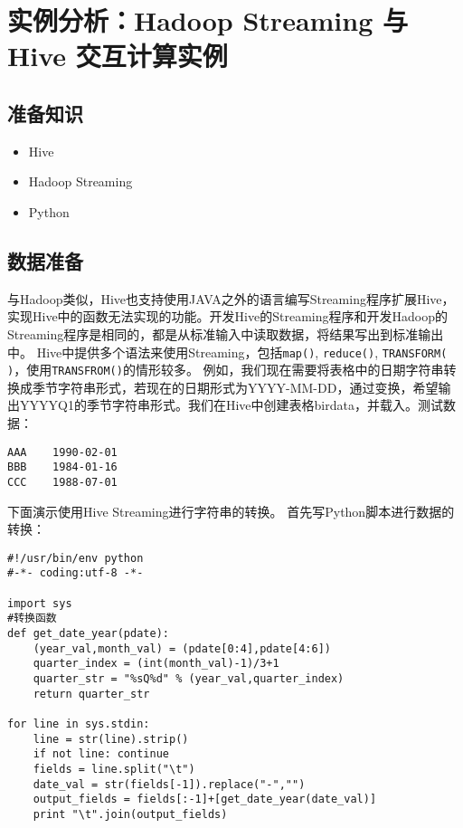 \section{实例分析：Hadoop Streaming 与 Hive
交互计算实例}\label{ux5b9eux4f8bux5206ux6790hadoop-streaming-ux4e0e-hive-ux4ea4ux4e92ux8ba1ux7b97ux5b9eux4f8b}

\subsection{准备知识}\label{ux51c6ux5907ux77e5ux8bc6}

\begin{itemize}
\itemsep1pt\parskip0pt
\item
  Hive
\item
  Hadoop Streaming
\item
  Python
\end{itemize}

\subsection{数据准备}\label{ux6570ux636eux51c6ux5907}

与Hadoop类似，Hive也支持使用JAVA之外的语言编写Streaming程序扩展Hive，实现Hive中的函数无法实现的功能。开发Hive的Streaming程序和开发Hadoop的Streaming程序是相同的，都是从标准输入中读取数据，将结果写出到标准输出中。
Hive中提供多个语法来使用Streaming，包括\texttt{map()}, \texttt{reduce()}, \texttt{TRANSFORM(
)}，使用\texttt{TRANSFROM()}的情形较多。
例如，我们现在需要将表格中的日期字符串转换成季节字符串形式，若现在的日期形式为YYYY-MM-DD，通过变换，希望输出YYYYQ1的季节字符串形式。我们在Hive中创建表格birdata，并载入。测试数据：

\begin{lstlisting}
AAA    1990-02-01
BBB    1984-01-16
CCC    1988-07-01
\end{lstlisting}

下面演示使用Hive Streaming进行字符串的转换。
首先写Python脚本进行数据的转换：

\begin{lstlisting}
#!/usr/bin/env python
#-*- coding:utf-8 -*-

import sys
#转换函数
def get_date_year(pdate):
    (year_val,month_val) = (pdate[0:4],pdate[4:6])
    quarter_index = (int(month_val)-1)/3+1
    quarter_str = "%sQ%d" % (year_val,quarter_index)
    return quarter_str

for line in sys.stdin:
    line = str(line).strip()
    if not line: continue
    fields = line.split("\t")
    date_val = str(fields[-1]).replace("-","")
    output_fields = fields[:-1]+[get_date_year(date_val)]
    print "\t".join(output_fields)
\end{lstlisting}


